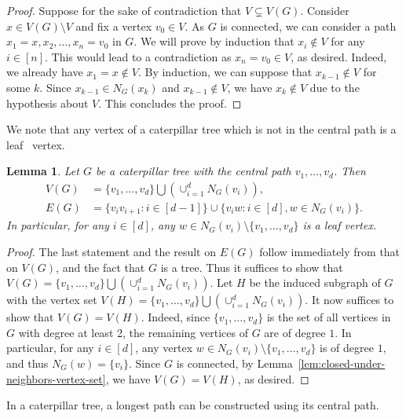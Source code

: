 \documentclass{amsart}
\newtheorem{lemma}[theorem]{Lemma}
\theoremstyle{remark}
\theoremstyle{definition}
\begin{document}
	\begin{proof}
		Suppose for the sake of contradiction that $V\subsetneq V(G)$. Consider $x\in V(G)\setminus V$ and fix a vertex $v_0\in V$. As $G$ is connected, we can consider a path $x_1=x,x_2,\dots, x_n=v_0$ in $G$. We will prove by induction that $x_i\notin V$ for any $i\in [n]$. This would lead to a contradiction as $x_n=v_0\in V$, as desired. Indeed, we already have $x_1=x\notin V$. By induction, we can suppose that $x_{k-1}\notin V$ for some $k$. Since $x_{k-1}\in N_G(x_k)$ and $x_{k-1}\notin V$, we have $x_k\notin V$ due to the hypothesis about $V$. This concludes the proof.
	\end{proof}

    We note that any vertex of a caterpillar tree which is not in the central path is a leaf ~vertex.
	
	\begin{lemma}\label{lem:caterpillar-all-vertices-and-edges}
		Let  $G$ be a caterpillar tree with the central path $v_1,\dots, v_d$. Then 
		\begin{align*}
			V(G)&=\{v_1,\dots, v_d\} \bigcup \left( \cup_{i=1}^d N_G(v_i) \right),\\
			E(G)&= \{v_iv_{i+1}\colon i\in [d-1]\} \cup \{ v_i w\colon i\in [d], w\in N_G(v_i)\}.
		\end{align*}
		In particular, for any $i\in [d]$, any $w\in N_G(v_i)\setminus \{v_1,\dots, v_d\}$ is a leaf vertex.
	\end{lemma}
	
	\begin{proof}
		The last statement and the result on $E(G)$ follow immediately from that on $V(G)$, and the fact that $G$ is a tree. Thus it suffices to show that $V(G)=\{v_1,\dots, v_d\} \bigcup \left( \cup_{i=1}^d N_G(v_i) \right)$.  Let $H$ be the induced subgraph of $G$ with the vertex set $V(H) = \{v_1,\dots, v_d\} \bigcup \left( \cup_{i=1}^d N_G(v_i) \right)$. It now suffices to show that $V(G)=V(H)$. Indeed, since $\{v_1,\dots , v_d\}$ is the set of all vertices in $G$ with degree at least 2, the remaining vertices of $G$ are of degree $1$. In particular, for any $i\in [d]$, any vertex $w \in N_G(v_i)\setminus \{v_1,\dots, v_d\}$ is of degree $1$, and thus $N_G(w)=\{v_i\}$. Since $G$ is connected, by Lemma~\ref{lem:closed-under-neighbors-vertex-set}, we have $V(G)=V(H)$, as desired.
	\end{proof}
	
	In a caterpillar tree, a longest path can be constructed using its central path. %
	
\end{document}
